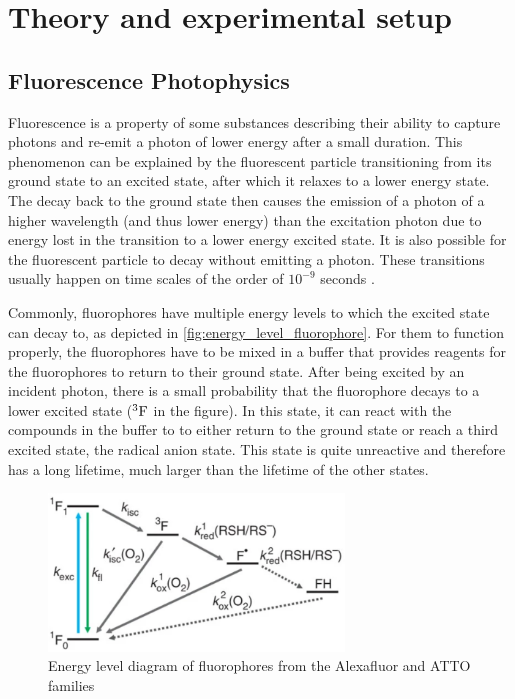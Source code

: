 \section{Theory and experimental setup}

\subsection{Fluorescence Photophysics} \label{sec:fluorescence_photophysics}
Fluorescence is a property of some substances describing their ability to capture photons and re-emit a photon of lower energy after a small duration. This phenomenon can be explained by the fluorescent particle transitioning from its ground state to an excited state, after which it relaxes to a lower energy state. The decay back to the ground state then causes the emission of a photon of a higher wavelength (and thus lower energy) than the excitation photon due to energy lost in the transition to a lower energy excited state. It is also possible for the fluorescent particle to decay without emitting a photon. These transitions usually happen on time scales of the order of $10^{-9}$ seconds \cite{douglass_notice_2023}.

Commonly, fluorophores have multiple energy levels to which the excited state can decay to, as depicted in \autoref{fig:energy_level_fluorophore}. For them to function properly, the fluorophores have to be mixed in a buffer that provides reagents for the fluorophores to return to their ground state. After being excited by an incident photon, there is a small probability that the fluorophore decays to a lower excited state ($^3\textrm F$ in the figure). In this state, it can react with the compounds in the buffer to to either return to the ground state or reach a third excited state, the radical anion state. This state is quite unreactive and therefore has a long lifetime, much larger than the lifetime of the other states.
\begin{figure}[htbp]
    \centering
    \includegraphics[width=0.7\textwidth]{figures/alexafluor-jablonski-diagram.png}
    \caption{Energy level diagram of fluorophores from the Alexafluor and ATTO families \cite{vandelinde-natureprotocols-2011}}
    \label{fig:energy_level_fluorophore}
\end{figure}

